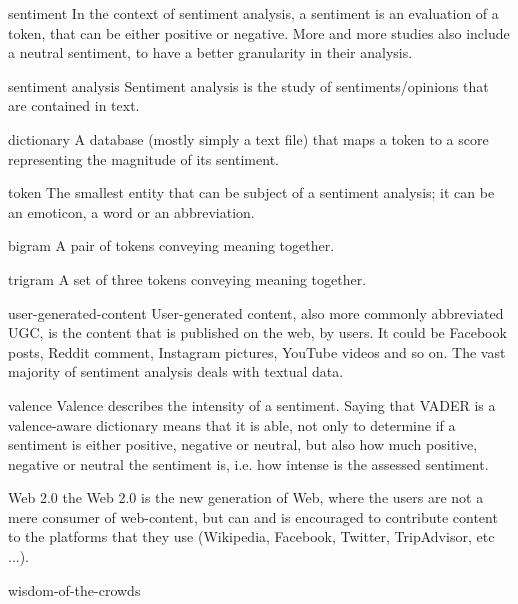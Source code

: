 	\begin{glossy}
		\item[sentiment] In the context of sentiment analysis, a sentiment is an evaluation of a token, that can be either positive or negative. More and more studies also include a neutral sentiment, to have a better granularity in their analysis.
		\item [sentiment analysis] Sentiment analysis is the study of sentiments/opinions that are contained in text.
		\item [dictionary] A database (mostly simply a text file) that maps a token to a score representing the magnitude of its sentiment.
		\item [token] The smallest entity that can be subject of a sentiment analysis; it can be an emoticon, a word or an abbreviation.
		\item [bigram] A pair of tokens conveying meaning together.
		\item [trigram] A set of three tokens conveying meaning together.
		\item [user-generated-content] User-generated content, also more commonly abbreviated UGC, is the content that is published on the web, by users. It could be Facebook posts, Reddit comment, Instagram pictures, YouTube videos and so on. The vast majority of sentiment analysis deals with textual data.
		\item [valence] Valence describes the intensity of a sentiment. Saying that VADER is a valence-aware dictionary means that it is able, not only to determine if a sentiment is either positive, negative or neutral, but also how much positive, negative or neutral the sentiment is, i.e. how intense is the assessed sentiment.
		\item [Web 2.0] the Web 2.0 is the new generation of Web, where the users are not a mere consumer of web-content, but can and is encouraged to contribute content to the platforms that they use (Wikipedia, Facebook, Twitter, TripAdvisor, etc ...).
		\item [wisdom-of-the-crowds]
	\end{glossy}
	